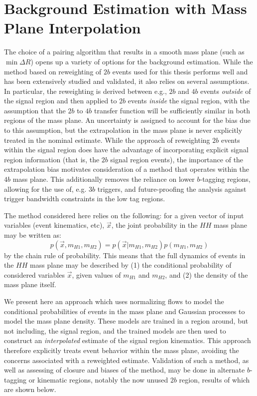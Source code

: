 \section{Background Estimation with Mass Plane Interpolation}
The choice of a pairing algorithm that results in a smooth mass plane (such as $\min{\Delta R}$) 
opens up a variety of options for the background estimation. While the method based on 
reweighting of $2b$ events used for this thesis performs well and has been extensively 
studied and validated, it also relies on several assumptions. In particular, the reweighting is derived 
between e.g., $2b$ and $4b$ events \emph{outside} of the signal region and then applied to $2b$ 
events \emph{inside} the signal region, with the assumption that the $2b$ to $4b$ transfer function 
will be sufficiently similar in both regions of the mass plane. An uncertainty is assigned to 
account for the bias due to this assumption, but the extrapolation in the mass plane is never 
explicitly treated in the nominal estimate. While the approach of reweighting $2b$ events within the 
signal region does have the advantage of incorporating explicit signal region information (that is, 
the $2b$ signal region events), the importance of the extrapolation bias motivates consideration 
of a method that operates within the $4b$ mass plane. This additionally removes the reliance on lower 
$b$-tagging regions, allowing for the use of, e.g. $3b$ triggers, and future-proofing the analysis 
against trigger bandwidth constraints in the low tag regions.

The method considered here relies on the following: for a given vector of 
input variables (event kinematics, etc), $\vec{x}$, the joint probability in the $HH$ mass 
plane may be written as:
\begin{equation}
p(\vec{x}, m_{H1}, m_{H2}) = p(\vec{x}| m_{H1}, m_{H2})p(m_{H1}, m_{H2})
\end{equation}
by the chain rule of probability. This means that the full dynamics of events 
in the $HH$ mass plane may be described by (1) the conditional probability of 
considered variables $\vec{x}$, given values of $m_{H1}$ and $m_{H2}$, and (2) the 
density of the mass plane itself. 

We present here an approach which uses normalizing flows  to model the 
conditional probabilities of events in the mass plane and Gaussian processes to 
model the mass plane density. These models are trained in a region around, but not 
including, the signal region, and the trained models are then used to construct an 
\emph{interpolated} estimate of the signal region kinematics. This approach therefore 
explicitly treats event behavior within the mass plane, avoiding the concerns associated 
with a reweighted estimate. Validation of such a method, as well as assessing of closure and 
biases of the method, may be done in alternate $b$-tagging or kinematic regions, notably the 
now unused $2b$ region, results of which are shown below.



